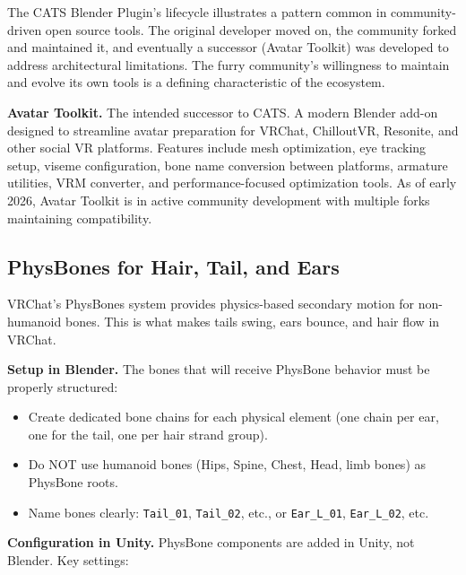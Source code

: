 \begin{historynote}
The CATS Blender Plugin's lifecycle illustrates a pattern common in community-driven open source tools. The original developer moved on, the community forked and maintained it, and eventually a successor (Avatar Toolkit) was developed to address architectural limitations. The furry community's willingness to maintain and evolve its own tools is a defining characteristic of the ecosystem.
\end{historynote}

\textbf{Avatar Toolkit.} The intended successor to CATS. A modern Blender add-on designed to streamline avatar preparation for VRChat, ChilloutVR, Resonite, and other social VR platforms. Features include mesh optimization, eye tracking setup, viseme configuration, bone name conversion between platforms, armature utilities, VRM converter, and performance-focused optimization tools. As of early 2026, Avatar Toolkit is in active community development with multiple forks maintaining compatibility.


\subsection{PhysBones for Hair, Tail, and Ears}

VRChat's PhysBones system provides physics-based secondary motion for non-humanoid bones. This is what makes tails swing, ears bounce, and hair flow in VRChat.

\textbf{Setup in Blender.} The bones that will receive PhysBone behavior must be properly structured:

\begin{itemize}[leftmargin=2em]
  \item Create dedicated bone chains for each physical element (one chain per ear, one for the tail, one per hair strand group).
  \item Do NOT use humanoid bones (Hips, Spine, Chest, Head, limb bones) as PhysBone roots.
  \item Name bones clearly: \texttt{Tail\_01}, \texttt{Tail\_02}, etc., or \texttt{Ear\_L\_01}, \texttt{Ear\_L\_02}, etc.
\end{itemize}

\textbf{Configuration in Unity.} PhysBone components are added in Unity, not Blender. Key settings:


